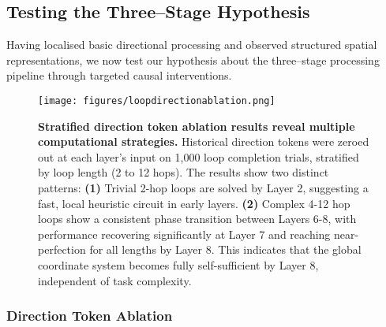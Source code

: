 


\subsection{Testing the Three--Stage Hypothesis}

Having localised basic directional processing and observed structured spatial representations, we now test our hypothesis about the three--stage processing pipeline through targeted causal interventions.

\begin{figure}[h]
\centering
\texttt{[image: figures/loopdirectionablation.png]}
\caption[Stratified direction token ablation results]{\textbf{Stratified direction token ablation results reveal multiple computational strategies.} Historical direction tokens were zeroed out at each layer's input on 1,000 loop completion trials, stratified by loop length (2 to 12 hops). The results show two distinct patterns: \textbf{(1)} Trivial 2-hop loops are solved by Layer 2, suggesting a fast, local heuristic circuit in early layers. \textbf{(2)} Complex 4-12 hop loops show a consistent phase transition between Layers 6-8, with performance recovering significantly at Layer 7 and reaching near-perfection for all lengths by Layer 8. This indicates that the global coordinate system becomes fully self-sufficient by Layer 8, independent of task complexity.}
\label{fig:direction_ablation}
\end{figure}

\subsubsection{Direction Token Ablation}


